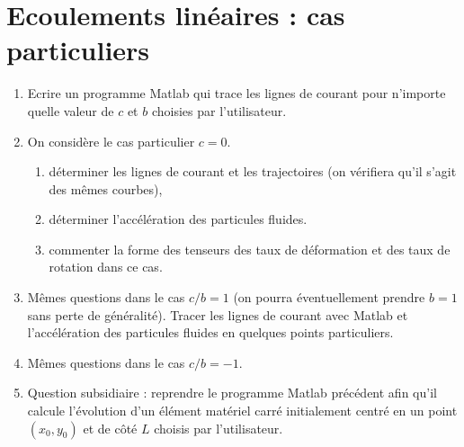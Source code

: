 \documentclass[10pt, a4paper]{article}
\begin{document}
\section{Ecoulements linéaires : cas particuliers}

\begin{enumerate}

\item
	Ecrire un programme Matlab qui trace les lignes de courant 
	pour n'importe quelle valeur de $c$ et $b$ choisies par l'utilisateur.

\item
	On considère le cas particulier $c=0$.
	\begin{enumerate}
	\item 
  		déterminer les lignes de courant et les trajectoires (on vérifiera qu'il s'agit 
  		des mêmes courbes),
	\item 
  		déterminer l'accélération des particules fluides.
	\item 
  		commenter la forme des tenseurs des taux de déformation et des taux de rotation dans ce cas.
	\end{enumerate}
\item
	Mêmes questions dans le cas $c/b=1$ (on pourra éventuellement prendre $b=1$ sans perte de généralité).
	Tracer les lignes de courant avec Matlab et l'accélération des particules fluides en quelques points particuliers.
\item
	Mêmes questions dans le cas $c/b=-1$.
\item
	Question subsidiaire : reprendre le programme Matlab précédent afin qu'il
	calcule l'évolution d'un élément matériel carré initialement centré en un point $(x_0, y_0)$ 
	et de côté $L$ choisis par l'utilisateur.	
	
\end{enumerate}


\end{document}
